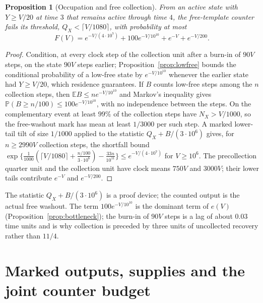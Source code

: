 \documentclass[11pt,a4paper]{article}
\theoremstyle{plain}
\newtheorem{proposition}[theorem]{Proposition}
\theoremstyle{definition}
\theoremstyle{remark}
\newcommand{\Prob}{\mathbb P}
\newcommand{\E}{\mathbb E}
\begin{document}
\begin{proposition}[Occupation and free collection]\label{prop:free}
From an active state with $Y\ge V/20$ at time $3$ that remains active through time $4$, the free-template counter fails its threshold, $Q_X<\lceil V/1080\rceil$, with probability at most
\begin{equation}\label{eq:F}
F(V)=e^{-V/(4\cdot10^{7})}+100e^{-V/10^{10}}+e^{-V}+e^{-V/200}.
\end{equation}
\end{proposition}
\begin{proof}
Condition, at every clock step of the collection unit after a burn-in of $90V$ steps, on the state $90V$ steps earlier; Proposition~\ref{prop:lowfree} bounds the conditional probability of a low-free state by $e^{-V/10^{10}}$ whenever the earlier state had $Y\ge V/20$, which residence guarantees. If $B$ counts low-free steps among the $n$ collection steps, then $\E B\le ne^{-V/10^{10}}$ and Markov's inequality gives $\Prob(B\ge n/100)\le100e^{-V/10^{10}}$, with no independence between the steps. On the complementary event at least $99\%$ of the collection steps have $N_X>V/1000$, so the free-washout mark has mean at least $1/3000$ per such step. A marked lower-tail tilt of size $1/1000$ applied to the statistic $Q_X+B/(3\cdot10^6)$ gives, for $n\ge2990V$ collection steps, the shortfall bound $\exp\{\tfrac1{1000}(\lceil V/1080\rceil+\tfrac{n/100}{3\cdot10^6})-\tfrac{33n}{10^{11}}\}\le e^{-V/(4\cdot10^7)}$ for $V\ge10^6$. The precollection quarter unit and the collection unit have clock means $750V$ and $3000V$; their lower tails contribute $e^{-V}$ and $e^{-V/200}$.
\end{proof}
The statistic $Q_X+B/(3\cdot10^6)$ is a proof device; the counted output is the actual free washout. The term $100e^{-V/10^{10}}$ is the dominant term of $e(V)$ (Proposition~\ref{prop:bottleneck}); the burn-in of $90V$ steps is a lag of about $0.03$ time units and is why collection is preceded by three units of uncollected recovery rather than $11/4$.

\section{Marked outputs, supplies and the joint counter budget}\label{sec:counters}
\end{document}

